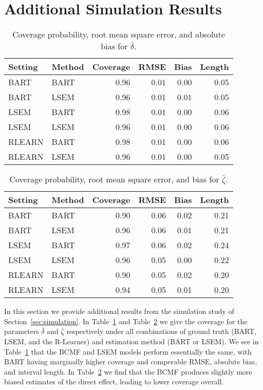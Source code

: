 \documentclass[12pt]{article}
\theoremstyle{remark}
\theoremstyle{definition}
\begin{document}
\section{Additional Simulation Results}

\begin{table}[p]
  \centering
  \begin{tabular}{llrrrr}
    \toprule
    Setting & Method & Coverage & RMSE & Bias & Length \\
    \midrule
    BART & BART & 0.96 & 0.01 & 0.00 & 0.05\\
    BART & LSEM & 0.96 & 0.01 & 0.01 & 0.05\\
    LSEM & BART & 0.98 & 0.01 & 0.00 & 0.06\\
    LSEM & LSEM & 0.96 & 0.01 & 0.00 & 0.06\\
    RLEARN & BART & 0.98 & 0.01 & 0.00 & 0.06\\
    RLEARN & LSEM & 0.96 & 0.01 & 0.00 & 0.05\\
    \bottomrule
  \end{tabular}
  \caption{Coverage probability, root mean square error, and absolute bias for $\bar \delta$.} \label{table:simulation_delta_avg}
\end{table}

\begin{table}[p]
  \begin{center}
    \begin{tabular}{llrrrr}
      \toprule
      Setting & Method & Coverage & RMSE & Bias & Length \\
      \midrule
      BART & BART & 0.90 & 0.06 & 0.02 & 0.21\\
      BART & LSEM & 0.96 & 0.06 & 0.01 & 0.21\\
      LSEM & BART & 0.97 & 0.06 & 0.02 & 0.24\\
      LSEM & LSEM & 0.96 & 0.05 & 0.00 & 0.22\\
      RLEARN & BART & 0.90 & 0.05 & 0.02 & 0.20\\
      RLEARN & LSEM & 0.94 & 0.05 & 0.01 & 0.20\\
      \bottomrule
    \end{tabular}
    \caption{Coverage probability, root mean square error, and bias for $\bar \zeta$.} \label{table:simulation_zeta_avg}
  \end{center}
\end{table}


In this section we provide additional results from the simulation study of Section~\ref{sec:simulation}. In Table~\ref{table:simulation_delta_avg} and Table~\ref{table:simulation_zeta_avg} we give the coverage for the parameters $\bar \delta$ and $\bar \zeta$ respectively under all combinations of ground truth (BART, LSEM, and the R-Learner) and estimation method (BART or LSEM). We see in Table~\ref{table:simulation_delta_avg} that the BCMF and LSEM models perform essentially the same, with BART having marginally higher coverage and comperable RMSE, absolute bias, and interval length. In Table~\ref{table:simulation_zeta_avg} we find that the BCMF produces slightly more biased estimates of the direct effect, leading to lower coverage overall.
\end{document}
